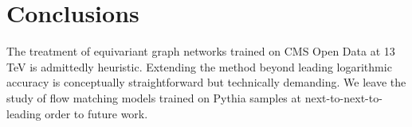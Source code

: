 \section{Conclusions}\label{sec:conclusions}

The treatment of equivariant graph networks trained on CMS Open Data at
13 TeV is admittedly heuristic. Extending the method beyond leading
logarithmic accuracy is conceptually straightforward but technically
demanding. We leave the study of flow matching models trained on Pythia
samples at next-to-next-to-leading order to future work.

